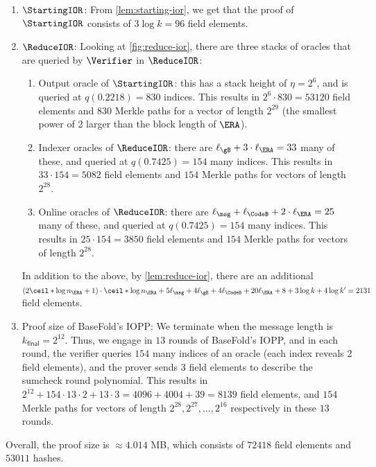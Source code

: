 \begin{enumerate}[nolistsep]
    \item $\StartingIOR$: From \cref{lem:starting-ior}, we get that the proof of $\StartingIOR$ consists of $3 \log k = 96$ field elements.
    \item $\ReduceIOR$: Looking at \cref{fig:reduce-ior}, there are three stacks of oracles that are queried by $\Verifier$ in $\ReduceIOR$:
    \begin{enumerate}[nolistsep]
        \item Output oracle of $\StartingIOR$: this has a stack height of $\eta = 2^6$, and is queried at $q(0.2218) = 830$ indices. 
        This results in $2^6\cdot 830 = 53120$ field elements and $830$ Merkle paths for a vector of length $2^{29}$ (the smallest power of 2 larger than the block length of $\ERA$).
        \item Indexer oracles of $\ReduceIOR$: there are $\ell_{\gB} + 3 \cdot \ell_{\ERA} = 33$ many of these, and queried at $q(0.7425) = 154$ many indices.
        This results in $33 \cdot 154 = 5082$ field elements and $154$ Merkle paths for vectors of length $2^{28}$.
        \item Online oracles of $\ReduceIOR$: there are $\ell_{\msg} + \ell_{\CodeB} + 2 \cdot \ell_{\ERA} = 25$ many of these, and queried at $q(0.7425) = 154$ many indices.
        This results in $25 \cdot 154 = 3850$ field elements and $154$ Merkle paths for vectors of length $2^{28}$.
    \end{enumerate}
    In addition to the above, by \cref{lem:reduce-ior}, there are an additional $(2\ceil*{\log n_{\ERA}} + 1) \cdot \ceil*{\log n_{\ERA}} + 5 \ell_{\msg} + 4 \ell_{\gB} + 4 \ell_{\CodeB} + 20 \ell_{\ERA} + 8 + 3 \log k + 4 \log k' = 2131$ field elements.
    \item Proof size of BaseFold's IOPP: We terminate when the message length is $k_{\mathsf{final}} = 2^{12}$.
    Thus, we engage in $13$ rounds of BaseFold's IOPP, and in each round, the verifier queries $154$ many indices of an oracle (each index reveals 2 field elements), and the prover sends 3 field elements to describe the sumcheck round polynomial.
    This results in $2^{12} + 154 \cdot 13 \cdot 2 + 13 \cdot 3 = 4096 + 4004 + 39 = 8139$ field elements, and $154$ Merkle paths for vectors of length $2^{28}, 2^{27}, \dots, 2^{16}$ respectively in these $13$ rounds.
\end{enumerate}
Overall, the proof size is $\approx 4.014$ MB, which consists of $72418$ field elements and $53011$ hashes.

